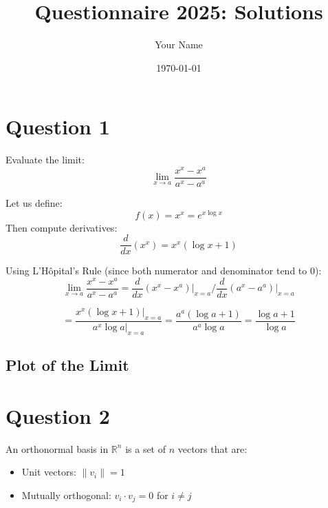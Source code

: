 \documentclass[12pt]{article}
\title{Questionnaire 2025: Solutions}
\author{Your Name}
\date{\today}
\begin{document}
\maketitle

\section*{Question 1}

Evaluate the limit:
\[
\lim_{x \to a} \frac{x^x - x^a}{a^x - a^a}
\]

Let us define:
\[
f(x) = x^x = e^{x \log x}
\]
Then compute derivatives:
\[
\frac{d}{dx}(x^x) = x^x(\log x + 1)
\]

Using L'Hôpital's Rule (since both numerator and denominator tend to 0):
\[
\lim_{x \to a} \frac{x^x - x^a}{a^x - a^a} = \frac{d}{dx}(x^x - x^a)\Big|_{x = a} \Bigg/ \frac{d}{dx}(a^x - a^a)\Big|_{x = a}
\]

\[
= \frac{x^x(\log x + 1)\big|_{x = a}}{a^x \log a\big|_{x = a}} = \frac{a^a(\log a + 1)}{a^a \log a} = \frac{\log a + 1}{\log a}
\]

\subsection*{Plot of the Limit}

\begin{center}
\end{center}

\newpage

\section*{Question 2}

An orthonormal basis in $\mathbb{R}^n$ is a set of $n$ vectors that are:
\begin{itemize}
    \item Unit vectors: $\|v_i\| = 1$
    \item Mutually orthogonal: $v_i \cdot v_j = 0$ for $i \neq j$
\end{itemize}
\end{document}
